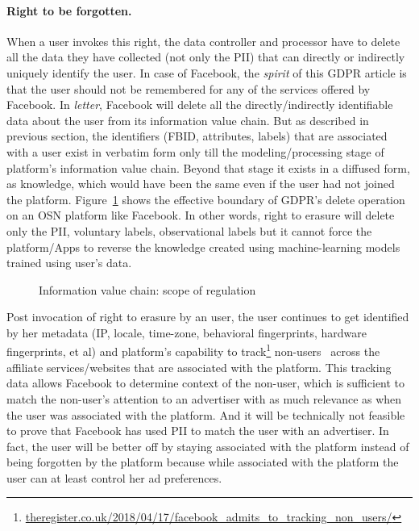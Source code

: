 \documentclass[a4paper,twoside]{article}
\begin{document}
\paragraph{Right to be forgotten.} When a user invokes this right, the
data controller and processor have to delete all the data they have
collected (not only the PII) that can directly or indirectly uniquely
identify the user. In case of Facebook, the \textit{spirit} of this
GDPR article is that the user should not be remembered for any of the
services offered by Facebook. In \textit{letter}, Facebook will delete
all the directly/indirectly identifiable data about the user from its
information value chain. But as described in previous section, the
identifiers (FBID, attributes, labels) that are associated with a user
exist in verbatim form only till the modeling/processing stage of
platform's information value chain. Beyond that stage it exists in a
diffused form, as knowledge, which would have been the same even if
the user had not joined the platform. Figure~\ref{fig:data-governance}
shows the effective boundary of GDPR's delete operation on an OSN
platform like Facebook. In other words, right to erasure will delete
only the PII, voluntary labels, observational labels but it cannot
force the platform/Apps to reverse the knowledge created using
machine-learning models trained using user's data.
%
\begin{figure}[!h]
  \centering
  {}
  \caption{Information value chain: scope of regulation}
  \label{fig:data-governance}
\end{figure}

Post invocation of right to erasure by an user, the user continues to
get identified by her metadata (IP, locale, time-zone, behavioral
fingerprints, hardware fingerprints, et al) and platform's capability
to
track\footnote{\href{https://www.theregister.co.uk/2018/04/17/facebook_admits_to_tracking_non_users/}{theregister.co.uk/2018/04/17/facebook\_admits\_to\_tracking\_non\_users/}}
non-users~\cite{social-plugins,web-never-forgets} across the affiliate
services/websites that are associated with the platform. This tracking
data allows Facebook to determine context of the non-user, which is
sufficient to match the non-user's attention to an advertiser with as
much relevance as when the user was associated with the platform. And
it will be technically not feasible to prove that Facebook has used
PII to match the user with an advertiser. In fact, the user will be
better off by staying associated with the platform instead of being
forgotten by the platform because while associated with the platform
the user can at least control her ad preferences.
\end{document}
